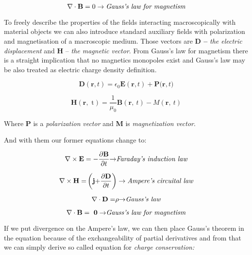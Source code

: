 \begin{equation}
\nabla \cdot \mathbf{B} =  0 \rightarrow \emph{Gauss's law for
magnetism}
\end{equation}

To freely describe the properties of the fields interacting
macroscopically with material objects we can also introduce
standard auxiliary fields with polarization and magnetisation of a
macroscopic medium. Those vectors are \textbf{D --} \emph{the electric
displacement} and \textbf{H} -- \emph{the magnetic vector}. From Gauss's
law for magnetism there is a straight implication that no magnetics
monopoles exist and Gauss's law may be also treated as electric charge
density definition.

\begin{equation}
\mathbf{D}\left( \mathbf{r,}t \right) = \epsilon_{0}\mathbf{E}\left( \mathbf{r,}t \right) + \mathbf{P(r,}t)
\end{equation}

\begin{equation}
\mathbf{H}\left( \mathbf{r,}\text{\ t} \right) = \frac{1}{\mu_{0}}\mathbf{B}\left( \mathbf{r,\ }t \right) - M(\mathbf{r,\ }t)
\end{equation}

\noindent Where \textbf{P} is a \emph{polarization} \emph{vector} and \textbf{M}
is \emph{magnetization vector}.

\noindent And with them our former equations change to:

\begin{equation}
\nabla \times \mathbf{E} = -\frac{\partial\mathbf{B}}{\partial t}\mathbf{\rightarrow}
\emph{Faraday's induction law}
\label{Faraday}
\end{equation}

\begin{equation}
\nabla \times \mathbf{H =}\left( \mathbf{j +}\frac{\partial\mathbf{D}}{\partial t} \right) \rightarrow
\emph{Ampere's circuital law}
\label{Ampere}
\end{equation}

\begin{equation}
\nabla \cdot \mathbf{D =}\rho\mathbf{\rightarrow} \emph{Gauss's
law}
\end{equation}

\begin{equation}
\nabla \cdot \mathbf{B = \ 0 \rightarrow} \emph{Gauss's law for
magnetism}
\end{equation}

If we put divergence on the Ampere's law, we can then place Gauss's
theorem in the equation because of the exchangeability of partial
derivatives and from that we can simply derive so called equation for
\emph{charge conservation:}


